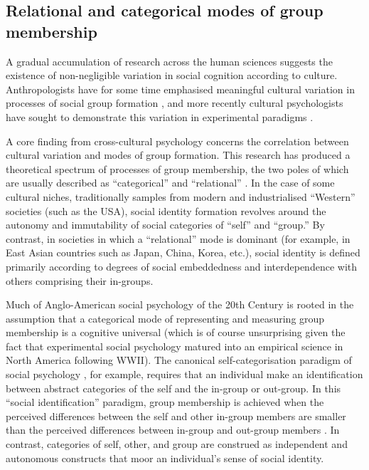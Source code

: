 \begin{CJK}{UTF8}{gbsn}


\subsection{Relational and categorical modes of group membership}

A gradual accumulation of research across the human sciences suggests the existence of non-negligible variation in social cognition according to culture.  Anthropologists have for some time emphasised meaningful cultural variation in processes of social group formation \citep{Strodtbeck1961,Kluckhohn1961,Mead1967,Fei1992}, and more recently cultural psychologists have sought to demonstrate this variation in experimental paradigms \citep{Markus1991,Nisbett2001}.

A core finding from cross-cultural psychology concerns the correlation between cultural variation and modes of group formation.  This research has produced a theoretical spectrum of processes of group membership, the two poles of which are usually described as ``categorical'' and ``relational'' \citep{Hofstede1980,Brewer2007}.  In the case of some cultural niches, traditionally samples from modern and industrialised ``Western'' societies (such as the USA), social identity formation revolves around the autonomy and immutability of social categories of ``self'' and ``group.''  By contrast, in societies in which a ``relational'' mode is dominant (for example, in East Asian countries such as Japan, China, Korea, etc.), social identity is defined primarily according to degrees of social embeddedness and interdependence with others comprising their in-groups\citep{Leung2012}.

Much of Anglo-American social psychology of the 20th Century is rooted in the assumption that a categorical mode of representing and measuring group membership is a cognitive universal (which is of course unsurprising given the fact that experimental social psychology matured into an empirical science in North America following WWII).  The canonical self-categorisation paradigm of social psychology \citep{Turner1987}, for example, requires that an individual make an identification between abstract categories of the self and the in-group or out-group. In this ``social identification'' paradigm, group membership is achieved when the perceived differences between the self and other in-group members are smaller than the perceived differences between in-group and out-group members \citep{Yuki2014}. In contrast, categories of self, other, and group are construed as independent and autonomous constructs that moor an individual's sense of social identity.


\end{CJK}
